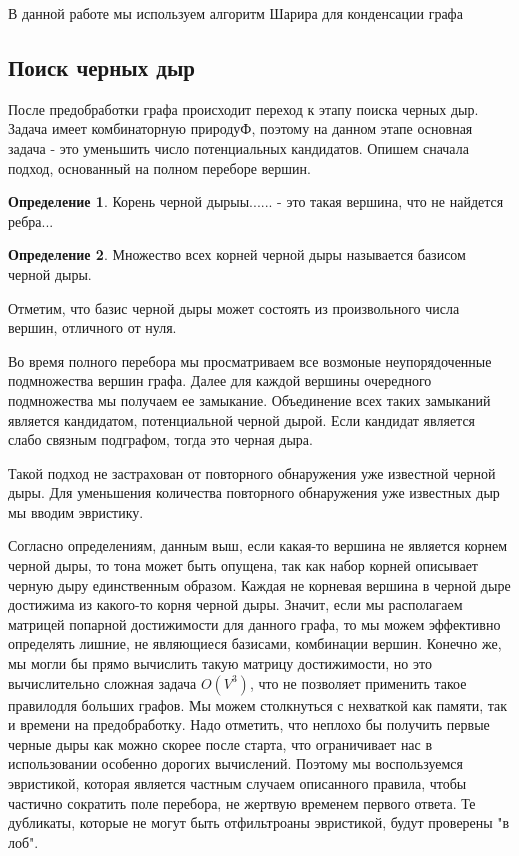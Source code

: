 \documentclass[12pt,a4paper,oneside]{article}
\theoremstyle{definition}
\newtheorem{definition}{Определение}[]
\theoremstyle{lemma}
\theoremstyle{remark}
\begin{document}
В данной работе мы используем алгоритм Шарира для конденсации графа \cite{sharir1981strong}

\subsection{Поиск черных дыр}

После предобработки графа происходит переход к этапу поиска черных дыр. Задача имеет комбинаторную природуФ, поэтому на данном этапе основная задача - это уменьшить число потенциальных кандидатов. Опишем сначала подход, основанный на полном переборе вершин.


\begin{definition}
Корень черной дырыы......  - это такая вершина, что не найдется ребра...
\end{definition}

\begin{definition}
Множество всех корней черной дыры называется базисом черной дыры.
\end{definition}

Отметим, что базис черной дыры может состоять из произвольного числа вершин, отличного от нуля.

Во время полного перебора мы просматриваем все возмоные неупорядоченные подмножества вершин графа. Далее для каждой вершины очередного подмножества мы получаем ее замыкание. Объединение всех таких замыканий является кандидатом, потенциальной черной дырой. Если кандидат является слабо связным подграфом, тогда это черная дыра.

Такой подход не застрахован от повторного обнаружения уже известной черной дыры. Для уменьшения количества повторного обнаружения уже известных дыр мы вводим эвристику.

Согласно определениям, данным выш, если какая-то вершина не является корнем черной дыры, то тона может быть опущена, так как набор корней описывает черную дыру единственным образом. Каждая не корневая вершина в черной дыре достижима из какого-то корня черной дыры. Значит, если мы располагаем матрицей попарной достижимости для данного графа, то мы можем эффективно определять лишние, не являющиеся базисами, комбинации вершин. Конечно же, мы могли бы прямо вычислить такую матрицу достижимости, но это вычислительно сложная задача $O(V^3)$, что не позволяет применить такое правилодля больших графов. Мы можем столкнуться с нехваткой как памяти, так и времени  на предобработку. Надо отметить, что неплохо бы получить первые черные дыры как можно скорее после старта, что ограничивает нас в использовании особенно дорогих вычислений. Поэтому мы воспользуемся эвристикой, которая является частным случаем описанного правила, чтобы частично сократить поле перебора, не жертвую временем первого ответа. Те дубликаты, которые не могут быть отфильтроаны эвристикой, будут проверены "в лоб".
\end{document}
